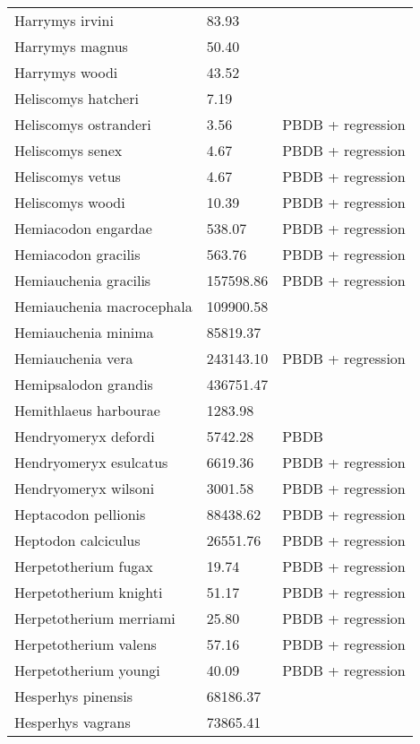 \documentclass{article}
\begin{document}
\begin{center}
\begin{longtable}{p{} p{} p{} }
  Harrymys irvini & 83.93 & \cite{Tomiya2013} \\ 
  Harrymys magnus & 50.40 & \cite{Tomiya2013} \\ 
  Harrymys woodi & 43.52 & \cite{Kirk2011} \\ 
  Heliscomys hatcheri & 7.19 & \cite{Wilson2012} \\ 
  Heliscomys ostranderi & 3.56 & PBDB + regression \\ 
  Heliscomys senex & 4.67 & PBDB + regression \\ 
  Heliscomys vetus & 4.67 & PBDB + regression \\ 
  Heliscomys woodi & 10.39 & PBDB + regression \\ 
  Hemiacodon engardae & 538.07 & PBDB + regression \\ 
  Hemiacodon gracilis & 563.76 & PBDB + regression \\ 
  Hemiauchenia gracilis & 157598.86 & PBDB + regression \\ 
  Hemiauchenia macrocephala & 109900.58 & \cite{Smith2004} \\ 
  Hemiauchenia minima & 85819.37 & \cite{Tomiya2013} \\ 
  Hemiauchenia vera & 243143.10 & PBDB + regression \\ 
  Hemipsalodon grandis & 436751.47 & \cite{Scott1937} \\ 
  Hemithlaeus harbourae & 1283.98 & \cite{Loomis1932} \\ 
  Hendryomeryx defordi & 5742.28 & PBDB \\ 
  Hendryomeryx esulcatus & 6619.36 & PBDB + regression \\ 
  Hendryomeryx wilsoni & 3001.58 & PBDB + regression \\ 
  Heptacodon pellionis & 88438.62 & PBDB + regression \\ 
  Heptodon calciculus & 26551.76 & PBDB + regression \\ 
  Herpetotherium fugax & 19.74 & PBDB + regression \\ 
  Herpetotherium knighti & 51.17 & PBDB + regression \\ 
  Herpetotherium merriami & 25.80 & PBDB + regression \\ 
  Herpetotherium valens & 57.16 & PBDB + regression \\ 
  Herpetotherium youngi & 40.09 & PBDB + regression \\ 
  Hesperhys pinensis & 68186.37 & \cite{Tomiya2013} \\ 
  Hesperhys vagrans & 73865.41 & \cite{Tomiya2013} \\ 

\end{longtable}
\end{center}
\end{document}
